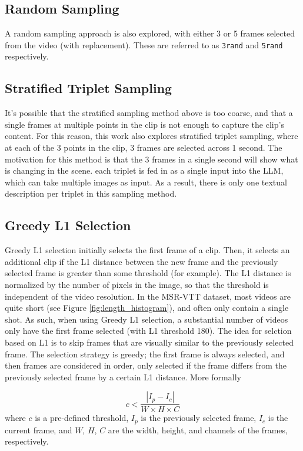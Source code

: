 \subsection{Random Sampling}
A random sampling approach is also explored, with either 3 or 5 frames selected from the video (with replacement).
These are referred to as \verb|3rand| and \verb|5rand| respectively.

\subsection{Stratified Triplet Sampling}
It's possible that the stratified sampling method above is too coarse, and that a single frames at multiple points in the clip is not enough to capture the clip's content.
For this reason, this work also explores stratified triplet sampling, where at each of the 3 points in the clip, 3 frames are selected across 1 second.
The motivation for this method is that the 3 frames in a single second will show what is changing in the scene.
each triplet is fed in as a single input into the LLM, which can take multiple images as input.
As a result, there is only one textual description per triplet in this sampling method.

\subsection{Greedy L1 Selection}
Greedy L1 selection initially selects the first frame of a clip. Then, it selects an additional clip if the L1 distance between the new frame and the previously selected frame is greater than some threshold (for example).
The L1 distance is normalized by the number of pixels in the image, so that the threshold is independent of the video resolution.
In the MSR-VTT dataset, most videos are quite short (see Figure \ref{fig:length_histogram}), and often only contain a single shot.
As such, when using Greedy L1 selection, a substantial number of videos only have the first frame selected (with L1 threshold 180).
The idea for selction based on L1 is to skip frames that are visually similar to the previously selected frame.
The selection strategy is greedy; the first frame is always selected, and then frames are considered in order, only selected if the frame differs from the previously selected frame by a certain L1 distance.
More formally

\begin{equation}
      c < \frac{|I_{p} - I_{c}|}{W \times H \times C}
\end{equation}
where $c$ is a pre-defined threshold, $I_{p}$ is the previously selected frame, $I_{c}$ is the current frame, and $W$, $H$, $C$ are the width, height, and channels of the frames, respectively.

